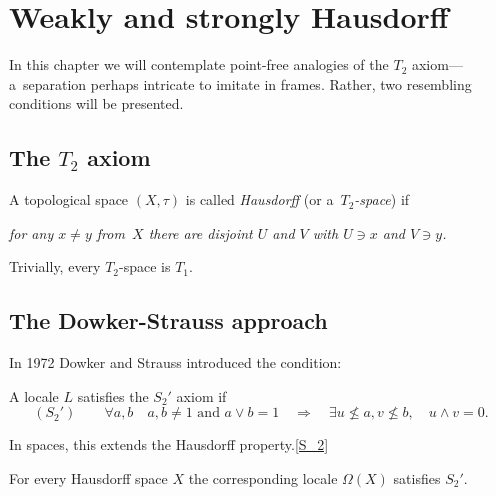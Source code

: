 \chapter{Weakly and strongly Hausdorff}

In this chapter we will contemplate point-free analogies of the $T_2$
axiom---a~separation perhaps intricate to imitate in frames.
Rather, two resembling conditions will be presented.

\section{The $T_2$ axiom}

\begin{framed}
  \begin{df}[$T_2$]
    A topological space $(X, \tau)$ is called \emph{Hausdorff\/} (or
    a~\emph{$T_2$-space\/}) if
    \begin{center} \it
      for any $x \ne y$ from~$X$ there are disjoint $U$ and $V$ with $U\owns x$
      and $V\owns y$.
    \end{center}
  \end{df}
\end{framed}

\begin{rem} \label{T2->T1}
  Trivially, every $T_2$-space is $T_1$.
\end{rem}

\section{The Dowker-Strauss approach}

In 1972 Dowker and Strauss \cite{ds72} introduced the condition:

\begin{framed}
  \begin{df}
    A locale $L$ satisfies the $S_2'$ axiom if
    \[
      (S_2') \qquad
      \forall a, b \quad a, b \ne 1 \text{ and } a \vee b = 1 \quad
      \Rightarrow \quad \exists u\not\leq a, v\not\leq b, \quad u \wedge v = 0.
    \]
  \end{df}
\end{framed}

In spaces, this extends the Hausdorff property.\eqref{S_2}

\begin{prop} \label{Haus->S2'}
  For every Hausdorff space $X$ the corresponding locale $\Omega(X)$ satisfies
  $S_2'$.
\end{prop}

